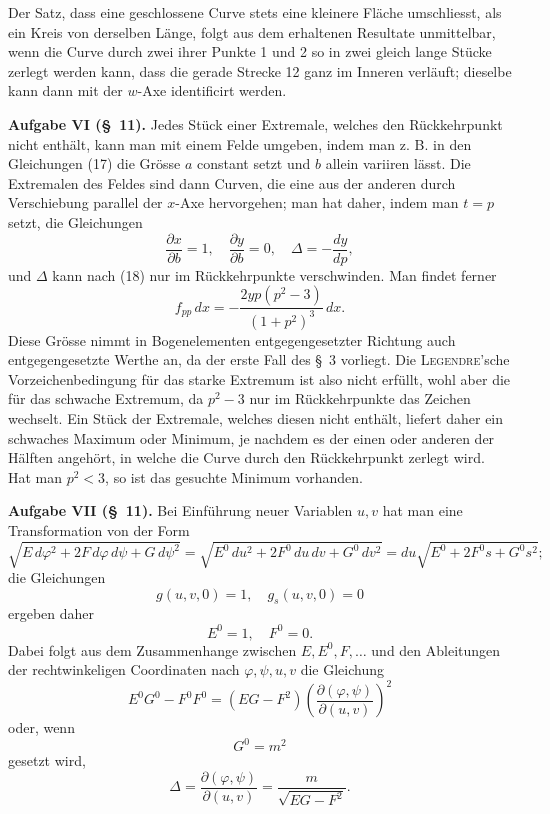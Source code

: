 \documentclass[11pt,a4paper,leqno]{article}
\begin{document}
Der Satz, dass eine geschlossene Curve stets eine kleinere Fläche umschliesst, als ein Kreis von derselben Länge, folgt aus dem erhaltenen Resultate unmittelbar, wenn die Curve durch zwei ihrer Punkte 1 und 2 so in zwei gleich lange Stücke zerlegt werden kann, dass die gerade Strecke 12 ganz im Inneren verläuft; dieselbe kann dann mit der $w$-Axe identificirt werden.

\bigskip

\noindent\textbf{Aufgabe VI (\S~11).} Jedes Stück einer Extremale, welches den Rückkehrpunkt nicht enthält, kann man mit einem Felde
umgeben, indem man z. B. in den Gleichungen (17) die Grösse $a$ constant setzt und $b$ allein variiren lässt. Die Extremalen des Feldes sind dann Curven, die eine aus der anderen durch Verschiebung parallel der $x$-Axe hervorgehen; man hat daher, indem man $t=p$ setzt, die Gleichungen
\[
\frac{\partial x}{\partial b}=1,\quad
\frac{\partial y}{\partial b}=0,\quad
\Delta=-\frac{dy}{dp},
\]
und $\Delta$ kann nach (18) nur im Rückkehrpunkte verschwinden. Man findet ferner
\[
f_{pp}\,dx=-\frac{2yp(p^2-3)}{(1+p^2)^3}\,dx.
\]
Diese Grösse nimmt in Bogenelementen entgegengesetzter Richtung auch entgegengesetzte Werthe an, da der erste Fall des \S~3 vorliegt. Die \textsc{Legendre}'sche Vorzeichenbedingung für das starke Extremum ist also nicht erfüllt, wohl aber die für das schwache Extremum, da $p^2-3$ nur im Rückkehrpunkte das Zeichen wechselt. Ein Stück der Extremale, welches diesen nicht enthält, liefert daher ein schwaches Maximum oder Minimum, je nachdem es der einen oder anderen der Hälften angehört, in welche die Curve durch den Rückkehrpunkt zerlegt wird. Hat man $p^2<3$, so ist das gesuchte Minimum vorhanden.

\bigskip

\noindent\textbf{Aufgabe VII (\S~11).} Bei Einführung neuer Variablen $u,v$ hat man eine Transformation von der Form
\[
\sqrt{E\,d\varphi^2+2F\,d\varphi\,d\psi+G\,d\psi^2}
=
\sqrt{E^0\,du^2+2F^0\,du\,dv+G^0\,dv^2}
=
du\sqrt{E^0+2F^0s+G^0s^2};
\]
die Gleichungen
\[
g(u,v,0)=1,\quad g_s(u,v,0)=0
\]
ergeben daher
\[
E^0=1,\quad F^0=0.
\]
Dabei folgt aus dem Zusammenhange zwischen $E,E^0,F,\ldots$ und den Ableitungen der rechtwinkeligen Coordinaten nach $\varphi,\psi,u,v$ die Gleichung
\[
E^0G^0-F^0F^0=(EG-F^2)\left(\frac{\partial(\varphi,\psi)}{\partial(u,v)}\right)^2
\]
oder, wenn
\[
G^0=m^2
\]
gesetzt wird,
\[
\Delta=\frac{\partial(\varphi,\psi)}{\partial(u,v)}
=\frac{m}{\sqrt{EG-F^2}}.
\]
\end{document}
